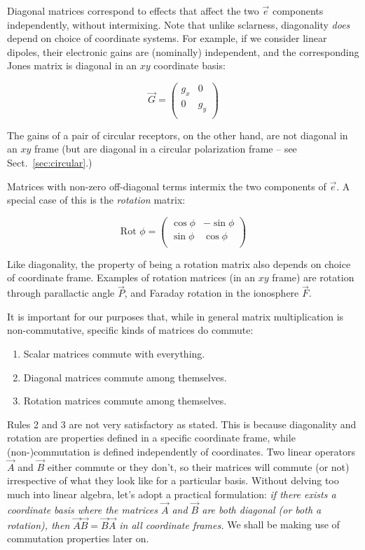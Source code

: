 \documentclass[]{aa}
\begin{document}
Diagonal matrices correspond to effects that affect the two $\vec e$ components independently, without intermixing. Note that unlike sclarness, diagonality {\em does} depend on choice of coordinate systems. For example, if we consider linear dipoles, their electronic gains are (nominally) independent, and the corresponding Jones matrix is diagonal in an $xy$ coordinate basis:

    \[
    \vec G = 
    \left( 
    \begin{array}{cc}
    g_x & 0 \\
    0 & g_y \\
    \end{array}
    \right) 
    \]

The gains of a pair of circular receptors, on the other hand, are not diagonal in an $xy$ frame (but are diagonal in a circular polarization frame -- see Sect.~\ref{sec:circular}.)

Matrices with non-zero off-diagonal terms intermix the two components of $\vec e$. A special case of this is the {\em rotation} matrix:

    \[
    \mbox{Rot~}\phi = 
    \left( 
    \begin{array}{cc}
    \cos\phi & -\sin\phi \\
    \sin\phi & \cos\phi \\
    \end{array}
    \right) 
    \]

Like diagonality, the property of being a rotation matrix also depends on choice of coordinate frame. Examples of rotation matrices (in an $xy$ frame) are rotation through parallactic angle $\vec P$, and Faraday rotation in the ionosphere $\vec F$.

It is important for our purposes that, while in general matrix multiplication is non-commutative, specific kinds of matrices do commute:

\begin{enumerate}
\item Scalar matrices commute with everything.
\item Diagonal matrices commute among themselves.
\item Rotation matrices commute among themselves. 
\end{enumerate}

Rules 2 and 3 are not very satisfactory as stated. This is because diagonality and rotation are properties defined in a specific coordinate frame, while (non-)commutation is defined independently of coordinates. Two linear operators $\vec A$ and $\vec B$ either commute or they don't, so their matrices will commute (or not) irrespective of what they look like for a particular basis. Without delving too much into linear algebra, let's adopt a practical formulation: {\em if there exists a coordinate basis where the matrices $\vec A$ and $\vec B$ are both diagonal (or both a rotation), then $\vec A \vec B=\vec B\vec A$ in all coordinate frames.} We shall be making use of commutation properties later on.
\end{document}
